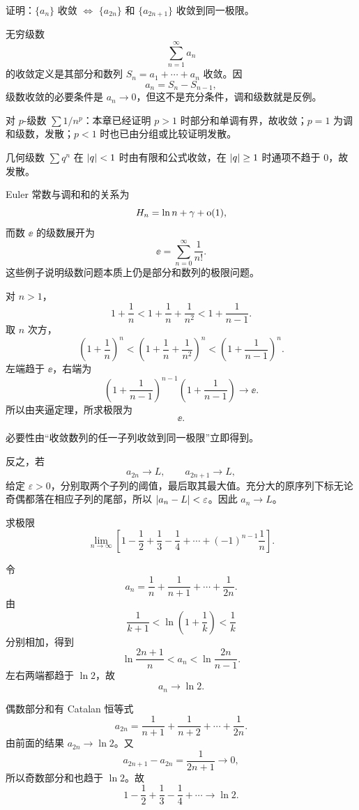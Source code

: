 \begin{xexercise}[3]
证明：$\{a_n\}$ 收敛 $\Longleftrightarrow$ $\{a_{2n}\}$ 和 $\{a_{2n+1}\}$ 收敛到同一极限。
\end{xexercise}
\begin{xsolution}
无穷级数
\[
  \sum_{n=1}^{\infty}a_n
\]
的收敛定义是其部分和数列 $S_n=a_1+\cdots+a_n$ 收敛。因
\[
  a_n=S_n-S_{n-1},
\]
级数收敛的必要条件是 $a_n\to0$，但这不是充分条件，调和级数就是反例。

对 $p$-级数 $\sum1/n^p$：本章已经证明 $p>1$ 时部分和单调有界，故收敛；$p=1$ 为调和级数，发散；$p<1$ 时也已由分组或比较证明发散。

几何级数 $\sum q^n$ 在 $\lvert q\rvert<1$ 时由有限和公式收敛，在 $\lvert q\rvert\ge1$ 时通项不趋于 $0$，故发散。

Euler 常数与调和和的关系为
\[
  H_n=\ln n+\gamma+\mathrm{o}(1),
\]
而数 $\ee$ 的级数展开为
\[
  \ee=\sum_{n=0}^{\infty}\frac1{n!}.
\]
这些例子说明级数问题本质上仍是部分和数列的极限问题。

对 $n>1$，
\[
  1+\frac1n
  <1+\frac1n+\frac1{n^2}
  <1+\frac1{n-1}.
\]
取 $n$ 次方，
\[
  \left(1+\frac1n\right)^n
  <\left(1+\frac1n+\frac1{n^2}\right)^n
  <\left(1+\frac1{n-1}\right)^n.
\]
左端趋于 $\ee$，右端为
\[
  \left(1+\frac1{n-1}\right)^{n-1}
  \left(1+\frac1{n-1}\right)\to\ee.
\]
所以由夹逼定理，所求极限为
\[
  \boxed{\ee}.
\]

必要性由“收敛数列的任一子列收敛到同一极限”立即得到。

反之，若
\[
  a_{2n}\to L,
  \qquad
  a_{2n+1}\to L,
\]
给定 $\varepsilon>0$，分别取两个子列的阈值，最后取其最大值。充分大的原序列下标无论奇偶都落在相应子列的尾部，所以 $\lvert a_n-L\rvert<\varepsilon$。因此 $a_n\to L$。
\end{xsolution}


\begin{xexercise}[4]
求极限
  \[
    \lim_{n\to\infty}\left[1-\frac12+\frac13-\frac14+\cdots+(-1)^{n-1}\frac1n\right].
  \]
\end{xexercise}
\begin{xsolution}
令
\[
  a_n=\frac1n+\frac1{n+1}+\cdots+\frac1{2n}.
\]
由
\[
  \frac1{k+1}<\ln\left(1+\frac1k\right)<\frac1k
\]
分别相加，得到
\[
  \ln\frac{2n+1}{n}<a_n<\ln\frac{2n}{n-1}.
\]
左右两端都趋于 $\ln2$，故
\[
  \boxed{a_n\to\ln2}.
\]

偶数部分和有 Catalan 恒等式
\[
  a_{2n}=\frac1{n+1}+\frac1{n+2}+\cdots+\frac1{2n}.
\]
由前面的结果 $a_{2n}\to\ln2$。又
\[
  a_{2n+1}-a_{2n}=\frac1{2n+1}\to0,
\]
所以奇数部分和也趋于 $\ln2$。故
\[
  \boxed{1-\frac12+\frac13-\frac14+\cdots\to\ln2}.
\]
\end{xsolution}


